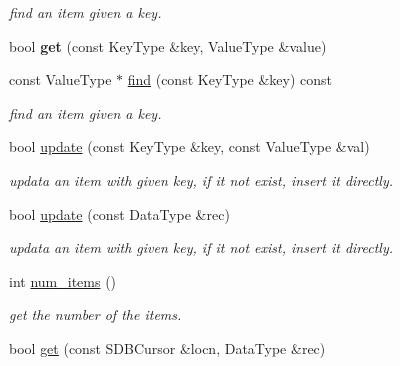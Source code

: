 \begin{CompactItemize}
\begin{CompactList}\small\item\em find an item given a key. \item\end{CompactList}\item 
\hypertarget{classsdb__btree_1fe7be112c01719109bf98f803777417}{
bool \textbf{get} (const KeyType \&key, ValueType \&value)}
\label{classsdb__btree_1fe7be112c01719109bf98f803777417}

\item 
\hypertarget{classsdb__btree_a4d71e716f6c61ff4f1f78317dcc9a17}{
const ValueType $\ast$ \hyperlink{classsdb__btree_a4d71e716f6c61ff4f1f78317dcc9a17}{find} (const KeyType \&key) const }
\label{classsdb__btree_a4d71e716f6c61ff4f1f78317dcc9a17}

\begin{CompactList}\small\item\em find an item given a key. \item\end{CompactList}\item 
\hypertarget{classsdb__btree_cb2ca67cdc1d405212cfd2332b626cda}{
bool \hyperlink{classsdb__btree_cb2ca67cdc1d405212cfd2332b626cda}{update} (const KeyType \&key, const ValueType \&val)}
\label{classsdb__btree_cb2ca67cdc1d405212cfd2332b626cda}

\begin{CompactList}\small\item\em updata an item with given key, if it not exist, insert it directly. \item\end{CompactList}\item 
\hypertarget{classsdb__btree_e0bab2b948984fcaae6d38f161fad06f}{
bool \hyperlink{classsdb__btree_e0bab2b948984fcaae6d38f161fad06f}{update} (const DataType \&rec)}
\label{classsdb__btree_e0bab2b948984fcaae6d38f161fad06f}

\begin{CompactList}\small\item\em updata an item with given key, if it not exist, insert it directly. \item\end{CompactList}\item 
\hypertarget{classsdb__btree_4c3e3043ff613cb1f81d6c7d60279562}{
int \hyperlink{classsdb__btree_4c3e3043ff613cb1f81d6c7d60279562}{num\_\-items} ()}
\label{classsdb__btree_4c3e3043ff613cb1f81d6c7d60279562}

\begin{CompactList}\small\item\em get the number of the items. \item\end{CompactList}\item 
\hypertarget{classsdb__btree_4796b30a0a456d6ff6f3c395f9a2647f}{
bool \hyperlink{classsdb__btree_4796b30a0a456d6ff6f3c395f9a2647f}{get} (const SDBCursor \&locn, DataType \&rec)}
\label{classsdb__btree_4796b30a0a456d6ff6f3c395f9a2647f}


\end{CompactItemize}
